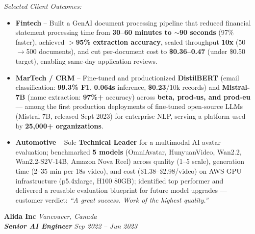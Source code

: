 \documentclass[10pt,a4paper]{article}
\begin{document}
\textit{Selected Client Outcomes:}
\begin{itemize}[leftmargin=1.2em, label=\textopenbullet]
  \item \textbf{Fintech} -- Built a GenAI document processing pipeline that reduced financial statement processing time from \textbf{30--60 minutes to $\sim$90 seconds} (97\% faster), achieved \textbf{$>$95\% extraction accuracy}, scaled throughput \textbf{10x} (50$\rightarrow$500 documents), and cut per-document cost to \textbf{\$0.36--0.47} (under \$0.50 target), enabling same-day application reviews.
  \item \textbf{MarTech / CRM} -- Fine-tuned and productionized \textbf{DistilBERT} (email classification: \textbf{99.3\% F1}, \textbf{0.064s} inference, \textbf{\$0.23}/10k records) and \textbf{Mistral-7B} (name extraction: \textbf{97\%+} accuracy) across \textbf{beta, prod-us, and prod-eu} --- among the first production deployments of fine-tuned open-source LLMs (Mistral-7B, released Sept 2023) for enterprise NLP, serving a platform used by \textbf{25,000+ organizations}.
  \item \textbf{Automotive} -- Sole \textbf{Technical Leader} for a multimodal AI avatar evaluation; benchmarked \textbf{5 models} (OmniAvatar, HunyuanVideo, Wan2.2, Wan2.2-S2V-14B, Amazon Nova Reel) across quality (1--5 scale), generation time (2--35 min per 18s video), and cost (\$1.38--\$2.98/video) on AWS GPU infrastructure (p5.4xlarge, H100 80GB); identified top performer and delivered a reusable evaluation blueprint for future model upgrades --- customer verdict: \textit{``A great success. Work of the highest quality.''}
\end{itemize}

\pagebreak
\noindent\textbf{Alida Inc} \hfill \textit{Vancouver, Canada} \\
\textit{\textbf{Senior AI Engineer}} \hfill \textit{Sep 2022 -- Jun 2023}
\end{document}
